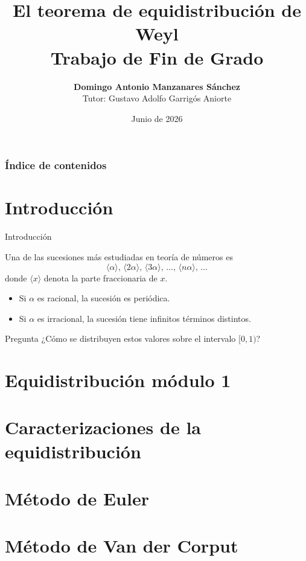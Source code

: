 \documentclass[11pt]{beamer}
\title[Trabajo de Fin de Grado]
{\Large El teorema de equidistribución de Weyl \\ [0.1cm] 
\small Trabajo de Fin de Grado}
\author[D. A. Manzanares Sánchez]
{\textbf{Domingo Antonio Manzanares Sánchez} \\ [0.3cm]
Tutor: Gustavo Adolfo Garrigós Aniorte}
\institute[UM]{Facultad de Matemáticas \\
Universidad de Murcia}
\date{Junio de 2026}
\newcommand{\partfrac}[1]{\langle #1 \rangle}
\begin{document}
\begin{frame}
\titlepage
\end{frame}

\begin{frame}
\frametitle{Índice de contenidos}
\tableofcontents
\end{frame}

\section{Introducción}

\begin{frame}{Introducción}

Una de las sucesiones más estudiadas en teoría de números es
\[
  \partfrac{\alpha}, \, 
  \partfrac{2\alpha}, \, 
  \partfrac{3\alpha}, \, 
  \ldots, \, 
  \partfrac{n\alpha}, \, 
  \ldots
\]
donde $\partfrac{ x }$ denota la parte fraccionaria de $x$.

\vspace{0.3cm}

\begin{itemize}
\item Si $\alpha$ es racional, la sucesión es periódica.
\item Si $\alpha$ es irracional, la sucesión tiene infinitos términos distintos.
\end{itemize}

\vspace{0.3cm}
\pause

\begin{block}{Pregunta}
¿Cómo se distribuyen estos valores sobre el intervalo $[0,1)$?
\end{block}

\end{frame}

\section{Equidistribución módulo 1}

\section{Caracterizaciones de la equidistribución}

\section{Método de Euler}

\section{Método de Van der Corput}

\end{document}
